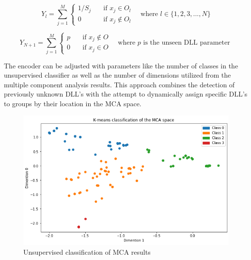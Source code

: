 \documentclass[a4paper,twoside,12pt]{book}
\begin{document}
\begin{equation} \label{enc_eqn}
	Y_{l} = 
	\sum_{j=1}^{M}
	\begin{cases}
		1/S_{j}       & \quad \text{if } x_{j} \in O_{l}\\
		0  & \quad \text{if } x_{j} \notin O_{l}
	  \end{cases} \quad \text{where }l \in \{1, 2, 3, ..., N\}
\end{equation}

\begin{equation} \label{enc_new_eqn}
	Y_{N+1} = 
	\sum_{j=1}^{M}
	\begin{cases}
		p      & \quad \text{if } x_{j} \notin O\\
		0  & \quad \text{if } x_{j} \in O
	  \end{cases} \quad \text{where }p \text{ is the unseen DLL parameter }
\end{equation}

The encoder can be adjusted with parameters like the number of classes in the unsupervised 
classifier as well as the number of dimensions utilized from the multiple component analysis results. 
This approach combines the detection of previously unknown DLL's with the attempt to dynamically
assign specific DLL's to groups by their location in the MCA space. 


 \begin{figure}
	\centering
	\includegraphics[scale=0.9]{images/KmeanMCA}
	\caption{Unsupervised classification of MCA results}
	\label{fig:kmeanmca}
 \end{figure}
\end{document}
